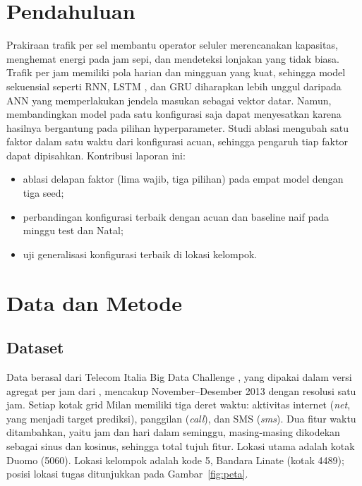 \documentclass[conference,a4paper]{IEEEtran}
\begin{document}
\section{Pendahuluan}
Prakiraan trafik per sel membantu operator seluler merencanakan kapasitas, menghemat energi pada jam sepi, dan mendeteksi lonjakan yang tidak biasa. Trafik per jam memiliki pola harian dan mingguan yang kuat, sehingga model sekuensial seperti RNN, LSTM \cite{hochreiter1997lstm}, dan GRU \cite{cho2014gru} diharapkan lebih unggul daripada ANN yang memperlakukan jendela masukan sebagai vektor datar. Namun, membandingkan model pada satu konfigurasi saja dapat menyesatkan karena hasilnya bergantung pada pilihan hyperparameter. Studi ablasi mengubah satu faktor dalam satu waktu dari konfigurasi acuan, sehingga pengaruh tiap faktor dapat dipisahkan. Kontribusi laporan ini:
\begin{itemize}\setlength{\itemsep}{0pt}
  \item ablasi delapan faktor (lima wajib, tiga pilihan) pada empat model dengan tiga seed;
  \item perbandingan konfigurasi terbaik dengan acuan dan baseline naif pada minggu test dan Natal;
  \item uji generalisasi konfigurasi terbaik di lokasi kelompok.
\end{itemize}

\section{Data dan Metode}

\subsection{Dataset}
Data berasal dari Telecom Italia Big Data Challenge \cite{barlacchi2015milan}, yang dipakai dalam versi agregat per jam dari \cite{zhang2021fedda}, mencakup November--Desember 2013 dengan resolusi satu jam. Setiap kotak grid Milan memiliki tiga deret waktu: aktivitas internet (\textit{net}, yang menjadi target prediksi), panggilan (\textit{call}), dan SMS (\textit{sms}). Dua fitur waktu ditambahkan, yaitu jam dan hari dalam seminggu, masing-masing dikodekan sebagai sinus dan kosinus, sehingga total tujuh fitur. Lokasi utama adalah kotak Duomo (5060). Lokasi kelompok adalah kode 5, Bandara Linate (kotak 4489); posisi lokasi tugas ditunjukkan pada Gambar~\ref{fig:peta}.
\end{document}
